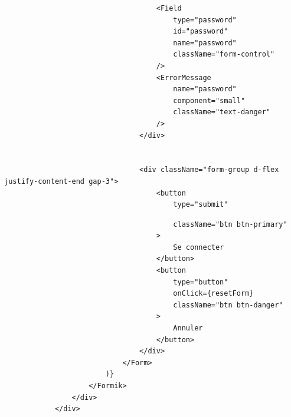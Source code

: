 \documentclass[5pt]{beamer}
\begin{document}
{\begin{frame}[fragile]{}
\begin{block}{}
\end{block}
\end{frame}

\begin{frame}[fragile]{}
\begin{block}{}
\begin{verbatim}
                                    <Field
                                        type="password"
                                        id="password"
                                        name="password"
                                        className="form-control"
                                    />
                                    <ErrorMessage
                                        name="password"
                                        component="small"
                                        className="text-danger"
                                    />
                                </div>
                               
                               
                                <div className="form-group d-flex justify-content-end gap-3">
                                    <button
                                        type="submit"
          \end{verbatim}

\end{block}
\end{frame}

\begin{frame}[fragile]{}
\begin{block}{}
\begin{verbatim}
                                        className="btn btn-primary"
                                    >
                                        Se connecter
                                    </button>
                                    <button
                                        type="button"
                                        onClick={resetForm}
                                        className="btn btn-danger"
                                    >
                                        Annuler
                                    </button>
                                </div>
                            </Form>
                        )}
                    </Formik>
                </div>
            </div>
            \end{verbatim}

\end{block}
\end{frame}

}
\end{document}
